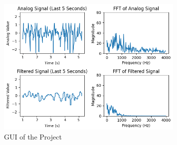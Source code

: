\begin{figure}[h]
	\centering
	\includegraphics[width=0.8\textwidth]{assets/plots.png}
	\caption{GUI of the Project}
	\label{fig:gui}
\end{figure}

